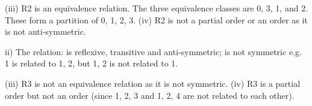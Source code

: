 (iii) R2 is an equivalence relation. The three equivalence classes are
{0, 3}, {1}, and {2}. These form a partition of {0, 1, 2, 3}.
(iv) R2 is not a partial order or an order as it is not anti-symmetric.



ii) The relation:
is reflexive, transitive and anti-symmetric;
is not symmetric e.g. {1} is related to {1, 2}, but {1, 2} is not
related to {1}.


(iii) R3 is not an equivalence relation as it is not symmetric.
(iv) R3 is a partial order but not an order (since {1, 2, 3} and {1, 2, 4}
are not related to each other).
